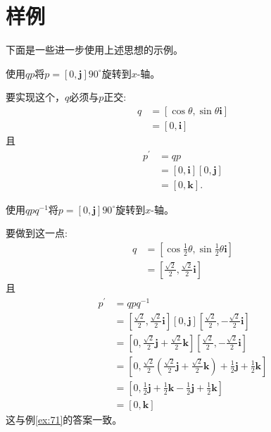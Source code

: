 \section{样例}
下面是一些进一步使用上述思想的示例。

\begin{example}\label{ex:71}
    使用$q p$将$p=[0, \mathbf{j}] 90^{\circ}$旋转到$x$-轴。

    要实现这个，$q$必须与$p$正交:
$$
\begin{aligned}
q & =[\cos \theta, \sin \theta \mathbf{i}] \\
& =[0, \mathbf{i}]
\end{aligned}
$$
且
$$
\begin{aligned}
p^{\prime} & =q p \\
& =[0, \mathbf{i}][0, \mathbf{j}] \\
& =[0, \mathbf{k}] .
\end{aligned}
$$


\end{example}




\begin{example}
    使用$q p q^{-1}$将$p=[0, \mathbf{j}] 90^{\circ}$旋转到$x$-轴。

    要做到这一点:
    $$
    \begin{aligned}
    q & =\left[\cos \frac{1}{2} \theta, \sin \frac{1}{2} \theta \mathbf{i}\right] \\
    & =\left[\frac{\sqrt{2}}{2}, \frac{\sqrt{2}}{2} \mathbf{i}\right]
    \end{aligned}
    $$
    且
    $$
    \begin{aligned}
    p^{\prime} & =q p q^{-1} \\
    & =\left[\frac{\sqrt{2}}{2}, \frac{\sqrt{2}}{2} \mathbf{i}\right][0, \mathbf{j}]\left[\frac{\sqrt{2}}{2},-\frac{\sqrt{2}}{2} \mathbf{i}\right] \\
    & =\left[0, \frac{\sqrt{2}}{2} \mathbf{j}+\frac{\sqrt{2}}{2} \mathbf{k}\right]\left[\frac{\sqrt{2}}{2},-\frac{\sqrt{2}}{2} \mathbf{i}\right] \\
    & =\left[0, \frac{\sqrt{2}}{2}\left(\frac{\sqrt{2}}{2} \mathbf{j}+\frac{\sqrt{2}}{2} \mathbf{k}\right)+\frac{1}{2} \mathbf{j}+\frac{1}{2} \mathbf{k}\right] \\
    & =\left[0, \frac{1}{2} \mathbf{j}+\frac{1}{2} \mathbf{k}-\frac{1}{2} \mathbf{j}+\frac{1}{2} \mathbf{k}\right] \\
    & =[0, \mathbf{k}]
    \end{aligned}
    $$
    这与例\ref{ex:71}的答案一致。

\end{example}


